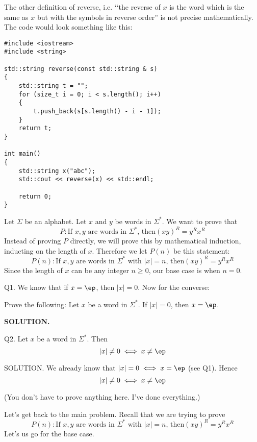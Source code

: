 The other definition of reverse, i.e. \lq\lq the reverse of 
$x$ is the word which is the same as $x$ but with the
symbols in reverse order'' is not precise mathematically.
The code would look something like this:
\begin{Verbatim}[frame=single]
#include <iostream>
#include <string>

std::string reverse(const std::string & s)
{
    std::string t = "";
    for (size_t i = 0; i < s.length(); i++)
    {
        t.push_back(s[s.length() - i - 1]);
    }
    return t;
}

int main()
{
    std::string x("abc");
    std::cout << reverse(x) << std::endl;
    
    return 0;
}
\end{Verbatim}




\newpage
Let $\Sigma$ be an alphabet.
Let $x$ and $y$ be words in $\Sigma^*$.
We want to prove that 
\[
P:
\text{
If $x,y$ are words in $\Sigma^*$, then
$(xy)^R = y^R x^R$
}
\]
Instead of proving $P$ directly, 
we will prove this by mathematical induction,
inducting on the length of $x$.
Therefore we let $P(n)$ be this statement:
\[
P(n): 
\text{
If $x,y$ are words in $\Sigma^*$ with $|x| = n$, then
$(xy)^R = y^R x^R$
}
\]
Since the length of $x$ can be any integer $n \geq 0$,
our base case is when $n = 0$.




\newpage
Q1. We know that if $x = \ep$, then $|x| = 0$.
Now for the converse:

Prove the following:
Let $x$ be a word in $\Sigma^*$.
If $|x| = 0$, then $x = \ep$.

\textbf{SOLUTION.}





\newpage
Q2. Let $x$ be a word in $\Sigma^*$.
Then 
\[
|x| \neq 0 \iff x \neq \ep
\]

\textsc{SOLUTION.}
We already know that $|x| = 0 \iff x = \ep$ (see Q1).
Hence
\[
|x| \neq 0 \iff x \neq \ep
\]

(You don't have to prove anything here. I've done everything.)




\newpage
Let's get back to the main problem.
Recall that we are trying to prove
\[
P(n): 
\text{
If $x,y$ are words in $\Sigma^*$ with $|x| = n$, then
$(xy)^R = y^R x^R$
}
\]
Let's us go for the base case.




